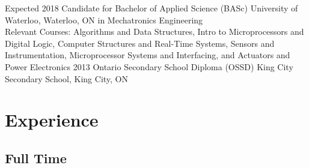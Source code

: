 \documentclass[hidelinks]{kkurucz-cv}
\begin{document}
\begin{entrylist}
\entry
{Expected 2018}
{Candidate for Bachelor of Applied Science (BASc)}
{University of Waterloo, Waterloo, ON}
{{\headingfont in Mechatronics Engineering}}
{
\\Relevant Courses: Algorithms and Data Structures, Intro to Microprocessors and Digital Logic, Computer Structures and Real-Time Systems, Sensors and Instrumentation, Microprocessor Systems and Interfacing, and Actuators and Power Electronics
}
\entry
{2013}
{Ontario Secondary School Diploma (OSSD)}
{King City Secondary School, King City, ON}
{\null}
{\null}
\end{entrylist}

\vspace{-2mm}
\section{Experience}

\subsection{Full Time}
\end{document}
